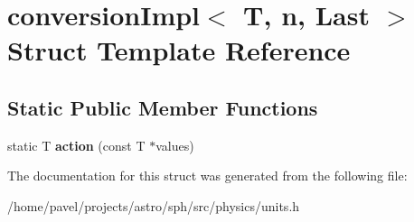 \hypertarget{structconversionImpl_3_01T_00_01n_00_01Last_01_4}{}\section{conversion\+Impl$<$ T, n, Last $>$ Struct Template Reference}
\label{structconversionImpl_3_01T_00_01n_00_01Last_01_4}
\subsection*{Static Public Member Functions}
\begin{DoxyCompactItemize}
\item 
\hypertarget{structconversionImpl_3_01T_00_01n_00_01Last_01_4_a3b684564b2dbfc35e66b46d4f9b48cf5}{}\label{structconversionImpl_3_01T_00_01n_00_01Last_01_4_a3b684564b2dbfc35e66b46d4f9b48cf5} 
static T {\bfseries action} (const T $\ast$values)
\end{DoxyCompactItemize}


The documentation for this struct was generated from the following file\+:\begin{DoxyCompactItemize}
\item 
/home/pavel/projects/astro/sph/src/physics/units.\+h\end{DoxyCompactItemize}
